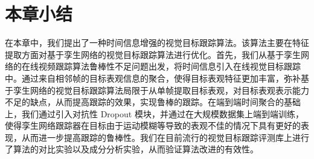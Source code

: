 \section{本章小结}
在本章中，我们提出了一种时间信息增强的视觉目标跟踪算法。该算法主要在特征提取方面对基于孪生网络的视觉目标跟踪算法进行优化。首先，我们从基于孪生网络的在线视频跟踪算法鲁棒性不足问题出发，将时间信息引入在线视觉目标跟踪中。通过来自相邻帧的目标表观信息的聚合，使得目标表观特征更加丰富，弥补基于孪生网络的视觉目标跟踪算法局限于从单帧提取目标表观，对目标表观表示能力不足的缺点，从而提高跟踪的效果，实现鲁棒的跟踪。在端到端时间聚合的基础上，我们通过引入对抗性 Dropout 模块，并通过在大规模数据集上端到端训练，使得孪生网络跟踪器在目标由于运动模糊等导致的表观不佳的情况下具有更好的表现，从而进一步提高跟踪的鲁棒性。我们在目前流行的视觉目标跟踪评测库上进行了算法的对比实验以及成分分析实验，从而验证算法改进的有效性。